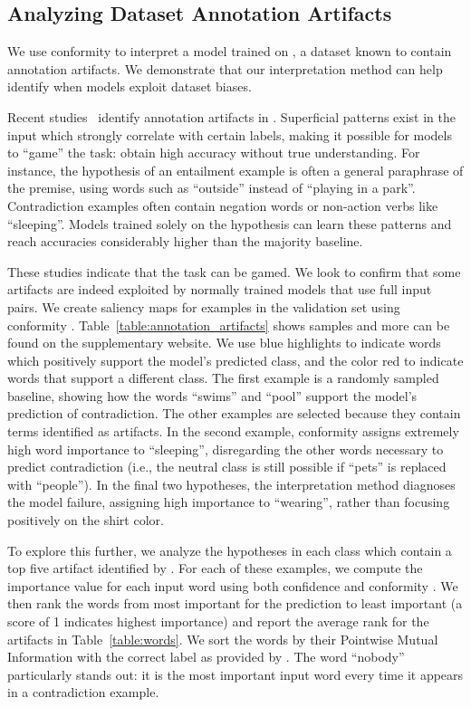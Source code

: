 \subsection{Analyzing Dataset Annotation Artifacts}
\label{sec:degenerate}

We use conformity \loo{} to interpret a model trained on , a dataset known to
contain annotation artifacts. We demonstrate that our interpretation
method can help identify when models exploit dataset biases.

Recent studies~\cite{gururangan2018annotation,poliak2018hypothesis}
identify annotation artifacts in . Superficial
patterns exist in the input which strongly correlate with certain
labels, making it possible for models to ``game'' the task: obtain high
accuracy without true understanding. For instance, the hypothesis of an
entailment example is often a general paraphrase of the premise, using
words such as ``outside'' instead of ``playing in a park''. Contradiction
examples often contain negation words or non-action verbs like ``sleeping''.
Models trained solely on the hypothesis can learn these patterns and reach
accuracies considerably higher than the majority baseline.

These studies indicate that the  task can be gamed. We look to confirm
that some artifacts
are indeed exploited by normally trained models that use full input pairs. We
create saliency maps for examples in the validation set using conformity
\loo{}. Table~\ref{table:annotation_artifacts} shows samples and more can be found on the
supplementary website. We use
blue highlights to indicate words which positively support the model's predicted class,
and the color red to indicate words that support a different class.
The first example is a randomly sampled baseline, showing how the words
``swims'' and ``pool'' support the model's prediction of contradiction.
The other examples are selected because they contain terms identified as artifacts.
In the second example, conformity \loo{} assigns extremely high word importance
to ``sleeping'', disregarding the other words necessary to predict contradiction (i.e., the neutral class is still possible
if ``pets'' is replaced with ``people''). In the final two hypotheses, the interpretation
method diagnoses the model failure, assigning high importance to ``wearing'', rather than
focusing positively on the shirt color.

To explore this further, we analyze the hypotheses in each  class
which contain a top five artifact identified by \citet{gururangan2018annotation}.
For each of these examples,
we compute the importance value for each input word using
both confidence and conformity \loo{}. We then rank the words from
most important for the prediction to least important (a score of 1
indicates highest importance) and report the average rank for the artifacts in Table~\ref{table:words}.
We sort the words by their Pointwise Mutual Information with the correct label as provided by \citet{gururangan2018annotation}.
The word ``nobody'' particularly stands out: it is the most important input word every time it appears
in a contradiction example. 

